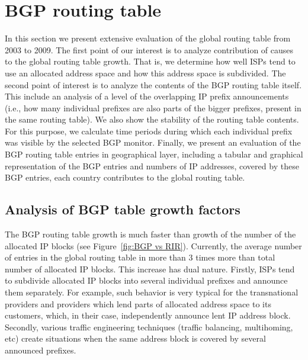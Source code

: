 \section{BGP routing table}
\label{sec:bgp}

In this section we present extensive evaluation of the global routing table
from 2003 to 2009. The first point of our interest is to analyze contribution
of causes to the global routing table growth. That is, we determine how well
ISPs tend to use an allocated address space and how this address space is
subdivided. The second point of interest is to analyze the contents of the BGP
routing table itself. This include an analysis of a level of the overlapping
IP prefix announcements (i.e., how many individual prefixes are also parts of
the bigger prefixes, present in the same routing table). We also show the
stability of the routing table contents. For this purpose, we calculate time
periods during which each individual prefix was visible by the selected BGP
monitor. Finally, we present an evaluation of the BGP routing table entries in
geographical layer, including a tabular and graphical representation of the
BGP entries and numbers of IP addresses, covered by these BGP entries, each
country contributes to the global routing table.

\subsection{Analysis of BGP table growth factors}

The BGP routing table growth is much faster than growth of the number of the
allocated IP blocks (see Figure~\ref{fig:BGP vs RIR}). Currently, the average
number of entries in the global routing table in more than 3 times more than
total number of allocated IP blocks. This increase has dual nature. Firstly,
ISPs tend to subdivide allocated IP blocks into several individual prefixes
and announce them separately. For example, such behavior is very typical for
the transnational providers and providers which lend parts of allocated
address space to its customers, which, in their case, independently announce
lent IP address block. Secondly, various traffic engineering techniques
(traffic balancing, multihoming, etc) create situations when the same address
block is covered by several announced prefixes.

